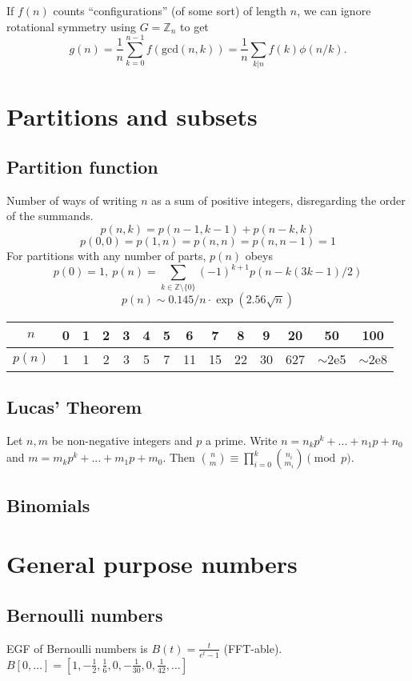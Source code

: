 		 If $f(n)$ counts ``configurations'' (of some sort) of length $n$, we can ignore rotational symmetry using $G = \mathbb Z_n$ to get
		 \[ g(n) = \frac 1 n \sum_{k=0}^{n-1}{f(\text{gcd}(n, k))} = \frac 1 n \sum_{k|n}{f(k)\phi(n/k)}. \]

\section{Partitions and subsets}
	\subsection{Partition function}
		Number of ways of writing $n$ as a sum of positive integers, disregarding the order of the summands.
		\[ p(n,k)=p(n-1,k-1)+p(n-k,k)\]
		\[ p(0,0)=p(1,n)=p(n,n)=p(n,n-1)=1\]
		For partitions with any number of parts, $p(n)$ obeys
		\[ p(0) = 1,\ p(n) = \sum_{k \in \mathbb Z \setminus \{0\}}{(-1)^{k+1} p(n - k(3k-1) / 2)} \]
		\[ p(n) \sim 0.145 / n \cdot \exp(2.56 \sqrt{n}) \]

		\begin{center}
		\begin{tabular}{c|c@{\ }c@{\ }c@{\ }c@{\ }c@{\ }c@{\ }c@{\ }c@{\ }c@{\ }c@{\ }c@{\ }c@{\ }c}
			$n$    & 0 & 1 & 2 & 3 & 4 & 5 & 6  & 7  & 8  & 9  & 20  & 50  & 100 \\ \hline
			$p(n)$ & 1 & 1 & 2 & 3 & 5 & 7 & 11 & 15 & 22 & 30 & 627 & $\mathtt{\sim}$2e5 & $\mathtt{\sim}$2e8 \\
		\end{tabular}
		\end{center}

	\subsection{Lucas' Theorem}
		Let $n,m$ be non-negative integers and $p$ a prime. Write $n=n_kp^k+...+n_1p+n_0$ and $m=m_kp^k+...+m_1p+m_0$. Then $\binom{n}{m} \equiv \prod_{i=0}^k\binom{n_i}{m_i} \pmod{p}$.

	\subsection{Binomials}

\section{General purpose numbers}
	\subsection{Bernoulli numbers}
		EGF of Bernoulli numbers is $B(t)=\frac{t}{e^t-1}$ (FFT-able).
		$B[0,\ldots] = [1, -\frac{1}{2}, \frac{1}{6}, 0, -\frac{1}{30}, 0, \frac{1}{42}, \ldots]$

